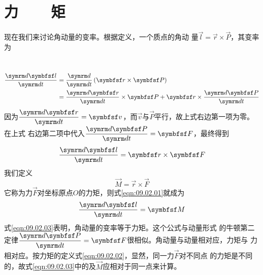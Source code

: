 \section[力矩]{力~~~~矩}\label{sec:09.02}

现在我们来讨论角动量的变率。根据定义，一个质点的角动
量$ \vec{l} = \vec{r} \times \vec{P} $，其变率为

~\vspace{-1.56em}
\begin{equation*}
  \begin{split}
    \frac { \dif \vec{l} } { \dif t } &= \frac { \dif } { \dif t } \left( \vec{r} \times \vec{P} \right) \\
    &= \frac { \dif \vec{r} } { \dif t } \times \vec{P} + \vec{r} \times \frac { \dif \vec{P} } { \dif t }
  \end{split}
\end{equation*}
因为$ \dfrac { \dif \vec{r} } { \dif t } = \vec{v} $，而$\vec{v}$与$\vec{P}$平行，故上式右边第一项为零。在上式
右边第二项中代入$\dfrac { \dif \vec{P} } { \dif t } = \vec{F}$，最终得到
\begin{equation}\label{eqn:09.02.01}
  \frac { \dif \vec{l} } { \dif t } = \vec{r} \times \vec{F}
\end{equation}
我们定义
\begin{equation}\label{eqn:09.02.02}
  \vec{M} = \vec{r} \times \vec{F}
\end{equation}
它称为力$\vec{F}$对坐标原点$O$的力矩，则式\eqref{eqn:09.02.01}就成为
\begin{equation}\label{eqn:09.02.03}
  \frac { \dif \vec{l} } { \dif t } = \vec{M}
\end{equation}
式\eqref{eqn:09.02.03}表明，角动量的变率等于力矩。这个公式与动量形式
的牛顿第二定律$ \dfrac { \dif \vec{P} } { \dif t } = \vec{F} $很相似。角动量与动量相对应，力矩与
力相对应。按力矩的定义\lhbrak 式\eqref{eqn:09.02.02}\rhbrak ，显然，同一力$\vec{F}$对不同点
的力矩是不同的，故式\eqref{eqn:09.02.03}中的及$\vec{M}$应相对于同一点来计算。

